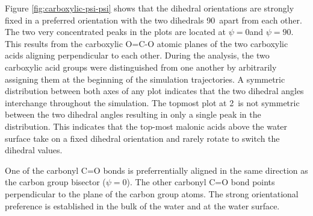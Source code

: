 Figure \ref{fig:carboxylic-psi-psi} shows that the dihedral orientations are strongly fixed in a preferred orientation with the two dihedrals 90\textdegree~apart from each other. The two very concentrated peaks in the plots are located at $\psi=0$\textdegree and $\psi=90$\textdegree. This results from the carboxylic O=C-O atomic planes of the two carboxylic acids aligning perpendicular to each other. During the analysis, the two carboxylic acid groups were distinguished from one another by arbitrarily assigning them at the beginning of the simulation trajectories. A symmetric distribution between both axes of any plot indicates that the two dihedral angles interchange throughout the simulation. The topmost plot at 2\angs~is not symmetric between the two dihedral angles resulting in only a single peak in the distribution. This indicates that the top-most malonic acids above the water surface take on a fixed dihedral orientation and rarely rotate to switch the dihedral values.

One of the carbonyl C=O bonds is preferrentially aligned in the same direction as the carbon group bisector ($\psi=0$\textdegree). The other carbonyl C=O bond points perpendicular to the plane of the carbon group atoms. The strong orientational preference is established in the bulk of the water and at the water surface.

